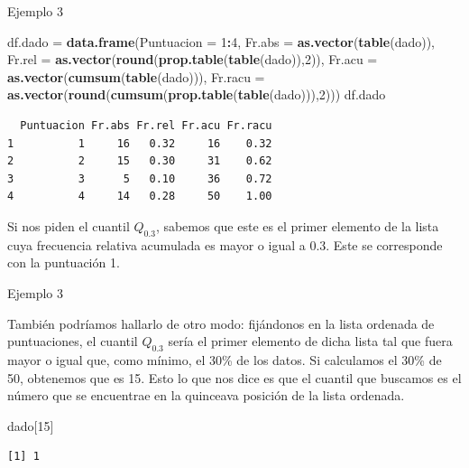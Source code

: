 \documentclass[
  ignorenonframetext,
]{beamer}
\newenvironment{Shaded}{\begin{snugshade}}{\end{snugshade}}
\newcommand{\DataTypeTok}[1]{\textcolor[rgb]{0.13,0.29,0.53}{#1}}
\newcommand{\DecValTok}[1]{\textcolor[rgb]{0.00,0.00,0.81}{#1}}
\newcommand{\KeywordTok}[1]{\textcolor[rgb]{0.13,0.29,0.53}{\textbf{#1}}}
\newcommand{\NormalTok}[1]{#1}
\newcommand{\OperatorTok}[1]{\textcolor[rgb]{0.81,0.36,0.00}{\textbf{#1}}}
\newcommand{\StringTok}[1]{\textcolor[rgb]{0.31,0.60,0.02}{#1}}
\begin{document}
\begin{frame}[fragile]{Ejemplo 3}
\protect\hypertarget{ejemplo-3-1}{}

\begin{Shaded}
\begin{Highlighting}[]
\NormalTok{df.dado =}\StringTok{ }\KeywordTok{data.frame}\NormalTok{(}\DataTypeTok{Puntuacion =} \DecValTok{1}\OperatorTok{:}\DecValTok{4}\NormalTok{,}
                      \DataTypeTok{Fr.abs =} \KeywordTok{as.vector}\NormalTok{(}\KeywordTok{table}\NormalTok{(dado)),}
                      \DataTypeTok{Fr.rel =} \KeywordTok{as.vector}\NormalTok{(}\KeywordTok{round}\NormalTok{(}\KeywordTok{prop.table}\NormalTok{(}\KeywordTok{table}\NormalTok{(dado)),}\DecValTok{2}\NormalTok{)),}
                      \DataTypeTok{Fr.acu =} \KeywordTok{as.vector}\NormalTok{(}\KeywordTok{cumsum}\NormalTok{(}\KeywordTok{table}\NormalTok{(dado))),}
                      \DataTypeTok{Fr.racu =} \KeywordTok{as.vector}\NormalTok{(}\KeywordTok{round}\NormalTok{(}\KeywordTok{cumsum}\NormalTok{(}\KeywordTok{prop.table}\NormalTok{(}\KeywordTok{table}\NormalTok{(dado))),}\DecValTok{2}\NormalTok{)))}
\NormalTok{df.dado}
\end{Highlighting}
\end{Shaded}

\begin{verbatim}
  Puntuacion Fr.abs Fr.rel Fr.acu Fr.racu
1          1     16   0.32     16    0.32
2          2     15   0.30     31    0.62
3          3      5   0.10     36    0.72
4          4     14   0.28     50    1.00
\end{verbatim}

Si nos piden el cuantil \(Q_{0.3}\), sabemos que este es el primer
elemento de la lista cuya frecuencia relativa acumulada es mayor o igual
a 0.3. Este se corresponde con la puntuación 1.

\end{frame}

\begin{frame}[fragile]{Ejemplo 3}
\protect\hypertarget{ejemplo-3-2}{}

También podríamos hallarlo de otro modo: fijándonos en la lista ordenada
de puntuaciones, el cuantil \(Q_{0.3}\) sería el primer elemento de
dicha lista tal que fuera mayor o igual que, como mínimo, el 30\% de los
datos. Si calculamos el 30\% de 50, obtenemos que es 15. Esto lo que nos
dice es que el cuantil que buscamos es el número que se encuentrae en la
quinceava posición de la lista ordenada.

\begin{Shaded}
\begin{Highlighting}[]
\NormalTok{dado[}\DecValTok{15}\NormalTok{]}
\end{Highlighting}
\end{Shaded}

\begin{verbatim}
[1] 1
\end{verbatim}

\end{frame}
\end{document}
